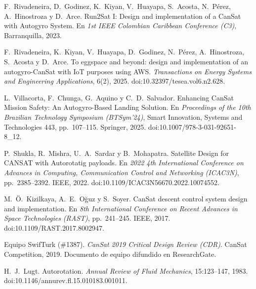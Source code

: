 
 F.~Rivadeneira, D.~Godinez, K.~Kiyan, V.~Huayapa,
  S.~Acosta, N.~Pérez, A.~Hinostroza y D.~Arce. Run2Sat I: Design and implementation of a
  CanSat with Autogyro System. En \emph{1st IEEE Colombian Caribbean Conference (C3)},
  Barranquilla, 2023.

 F.~Rivadeneira, K.~Kiyan, V.~Huayapa, D.~Godinez,
  N.~Pérez, A.~Hinostroza, S.~Acosta y D.~Arce. To eggspace and beyond: design and
  implementation of an autogyro-CanSat with IoT purposes using AWS. \emph{Transactions on
  Energy Systems and Engineering Applications}, 6(2), 2025.
  doi:10.32397/tesea.vol6.n2.628.

 L.~Villacorta, F.~Chunga, G.~Aquino y C.~D.~Salvador.
  Enhancing CanSat Mission Safety: An Autogyro-Based Landing Solution. En
  \emph{Proceedings of the 10th Brazilian Technology Symposium (BTSym'24)}, Smart
  Innovation, Systems and Technologies 443, pp.~107--115. Springer, 2025.
  doi:10.1007/978-3-031-92651-8\_12.

 P.~Shukla, R.~Mishra, U.~A.~Sardar y B.~Mohapatra.
  Satellite Design for CANSAT with Autorotatig payloads. En \emph{2022 4th International
  Conference on Advances in Computing, Communication Control and Networking (ICAC3N)},
  pp.~2385--2392. IEEE, 2022. doi:10.1109/ICAC3N56670.2022.10074552.

 M.~Ö.~Kizilkaya, A.~E.~Oğuz y S.~Soyer. CanSat descent
  control system design and implementation. En \emph{8th International Conference on
  Recent Advances in Space Technologies (RAST)}, pp.~241--245. IEEE, 2017.
  doi:10.1109/RAST.2017.8002947.

 Equipo SwifTurk (\#1387). \emph{CanSat 2019 Critical
  Design Review (CDR)}. CanSat Competition, 2019. Documento de equipo difundido en
  ResearchGate.

 H.~J.~Lugt. Autorotation. \emph{Annual Review of Fluid
  Mechanics}, 15:123--147, 1983. doi:10.1146/annurev.fl.15.010183.001011.


